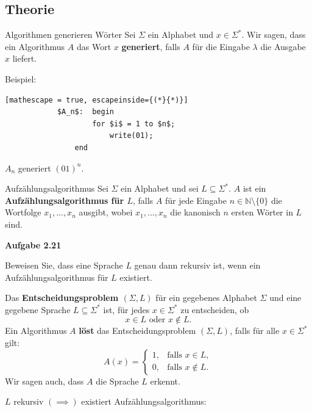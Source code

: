 \documentclass[a4paper, 11pt]{article}
\def\N{\mathbb{N}}
\begin{document}
    \subsection{Theorie}
        \begin{mainbox}{Algorithmen generieren Wörter}
            Sei $\Sigma$ ein Alphabet und $x \in \Sigma^*$. Wir sagen, dass ein Algorithmus $A$ das Wort $x$ \textbf{generiert}, falls $A$ für die Eingabe $\lambda$ die Ausgabe $x$ liefert.
        \end{mainbox}
        Beispiel:
        \begin{lstlisting}[mathescape = true, escapeinside={(*}{*)}]
            $A_n$: 	begin
                    for $i$ = 1 to $n$;
                        write(01);
                end
           \end{lstlisting}
           $A_n$ generiert $(01)^n$.
    
        \begin{mainbox}{Aufzählungsalgorithmus}
            Sei $\Sigma$ ein Alphabet und sei $L \subseteq \Sigma^*$. $A$ ist ein \textbf{Aufzählungsalgorithmus für $L$}, 
            falls $A$  für jede Eingabe $n \in \N \setminus \{0\}$ die Wortfolge $x_1, ...,x_n$ ausgibt, wobei $x_1, ...,x_n$ die kanonisch $n$ ersten Wörter in $L$ sind.
        \end{mainbox}
    
        \textbf{Aufgabe 2.21}
        
        Beweisen Sie, dass eine Sprache $L$ genau dann rekursiv ist, wenn ein Aufzählungsalgorithmus für $L$ existiert.
        \begin{mainbox}{}
            Das \textbf{Entscheidungsproblem $(\Sigma, L)$} für ein gegebenes Alphabet $\Sigma$ und eine gegebene Sprache $L \subseteq \Sigma^*$ ist, für jedes $x \in \Sigma^*$ zu entscheiden, ob 
            $$x \in L \text{ oder } x \notin L.$$
            Ein Algorithmus $A$ \textbf{löst} das Entscheidungsproblem $(\Sigma, L)$, falls für alle $x \in \Sigma^*$ gilt:
            $$A(x) = \begin{cases}
                1, &\text{falls }x \in L,\\
                0, &\text{falls }x \notin L.
            \end{cases}$$
            Wir sagen auch, dass $A$ die Sprache $L$ erkennt.
        \end{mainbox}
    
        $L$ rekursiv $(\implies)$ existiert Aufzählungsalgorithmus:
    
\end{document}
